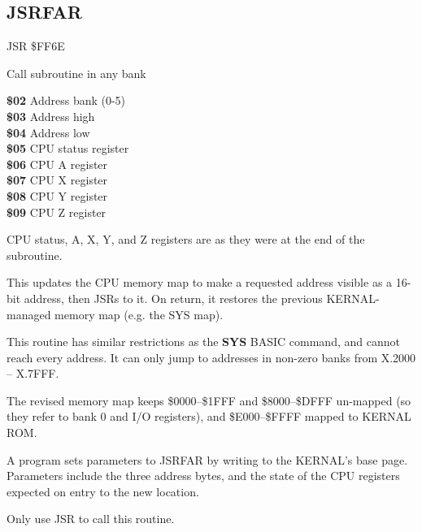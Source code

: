 
\newpage
\subsection{JSRFAR}
\label{KERNAL Jump Table!JSRFAR}
\begin{description}[leftmargin=2cm,style=nextline]
    \item [Address:] JSR \$FF6E
    \item [Description:] Call subroutine in any bank
    \item [Inputs:]
        \textbf{\$02} Address bank (0-5) \\
        \textbf{\$03} Address high \\
        \textbf{\$04} Address low \\
        \textbf{\$05} CPU status register \\
        \textbf{\$06} CPU A register \\
        \textbf{\$07} CPU X register \\
        \textbf{\$08} CPU Y register \\
        \textbf{\$09} CPU Z register
    \item [Outputs:]
        CPU status, A, X, Y, and Z registers are as they were at the end of the subroutine.
    \item [Remarks:]
        This updates the CPU memory map to make a requested address visible as a 16-bit address, then JSRs to it. On return, it restores the previous KERNAL-managed memory map (e.g. the SYS map).

        This routine has similar restrictions as the \textbf{SYS} BASIC command, and cannot reach every address. It can only jump to addresses in non-zero banks from X.2000 -- X.7FFF.

        The revised memory map keeps \$0000--\$1FFF and \$8000--\$DFFF un-mapped (so they refer to bank 0 and I/O registers), and \$E000--\$FFFF mapped to KERNAL ROM.

        A program sets parameters to JSRFAR by writing to the KERNAL's base page. Parameters include the three address bytes, and the state of the CPU registers expected on entry to the new location.

        Only use JSR to call this routine.
    \item [Example:]
\end{description}


